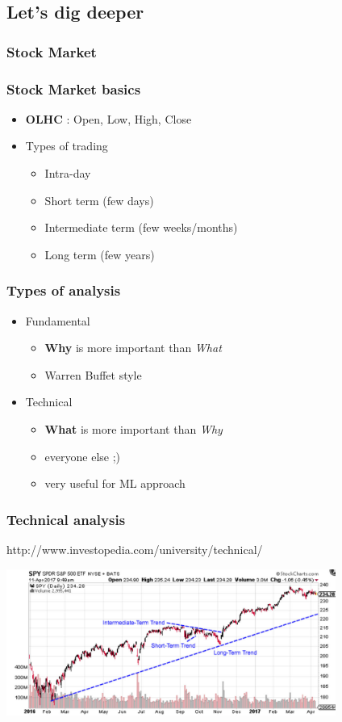 \documentclass{beamer}
\begin{document}
\subsection{Let's dig deeper}
\subsubsection{Stock Market}
\begin{frame}
  \frametitle{Stock Market basics}
  \begin{itemize}[<+->]
  \item \textbf{OLHC} : Open, Low, High, Close
  \item Types of trading
    \begin{itemize}
    \item Intra-day
    \item Short term (few days)
    \item Intermediate term (few weeks/months)
    \item Long term (few years)
    \end{itemize}
  \end{itemize}
\end{frame}
\begin{frame}
  \frametitle{Types of analysis}
  \begin{itemize}[<+->]
  \item Fundamental
    \begin{itemize}
    \item \textbf{Why} is more important than \textit{What}
    \item Warren Buffet style
    \end{itemize}
  \item Technical
    \begin{itemize}
    \item \textbf{What} is more important than \textit{Why}
    \item everyone else ;)
    \item very useful for ML approach
    \end{itemize}
  \end{itemize}
\end{frame}
\begin{frame}
  \frametitle{Technical analysis}
  http://www.investopedia.com/university/technical/

  \includegraphics[width=10.8cm]{4new.jpg}
\end{frame}
\end{document}
